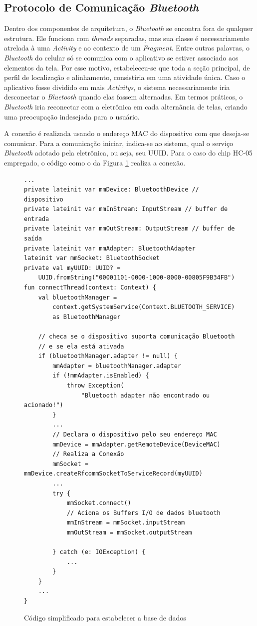 \subsection{Protocolo de Comunicação \textit{Bluetooth}}
\label{sec:btandroid}
Dentro dos componentes de arquitetura, o \textit{Bluetooth} se encontra fora de qualquer estrutura. Ele funciona com \textit{threads} separadas, mas sua classe é necessariamente atrelada à uma \textit{Activity} e ao contexto de um \textit{Fragment}. Entre outras palavras, o \textit{Bluetooth} do celular só se comunica com o aplicativo se estiver associado aos elementos da tela. Por esse motivo, estabeleceu-se que toda a seção principal, de perfil de localização e alinhamento, consistiria em uma atividade única. Caso o aplicativo fosse dividido em mais \textit{Activitys}, o sistema necessariamente iria desconectar o \textit{Bluetooth} quando elas fossem alternadas. Em termos práticos, o \textit{Bluetooth} iria reconectar com a eletrônica em cada alternância de telas, criando uma preocupação indesejada para o usuário. 

A conexão é realizada usando o endereço MAC do dispositivo com que deseja-se comunicar. Para a comunicação iniciar, indica-se ao sistema, qual o serviço \textit{Bluetooth} adotado pela eletrônica, ou seja, seu UUID. Para o caso do chip HC-05 empregado, o código como o da Figura \ref{code:bluetoothconnection} realiza a conexão.

\begin{figure}[!htb]
	\centering
	\caption{Código simplificado para estabelecer a base de dados}
	\vspace{-15pt}
	\begin{verbatim}
...
private lateinit var mmDevice: BluetoothDevice // dispositivo
private lateinit var mmInStream: InputStream // buffer de entrada
private lateinit var mmOutStream: OutputStream // buffer de saída
private lateinit var mmAdapter: BluetoothAdapter 
lateinit var mmSocket: BluetoothSocket
private val myUUID: UUID? =
	UUID.fromString("00001101-0000-1000-8000-00805F9B34FB")
fun connectThread(context: Context) {
	val bluetoothManager =
		context.getSystemService(Context.BLUETOOTH_SERVICE)
		as BluetoothManager
	
	// checa se o dispositivo suporta comunicação Bluetooth
	// e se ela está ativada
	if (bluetoothManager.adapter != null) {
		mmAdapter = bluetoothManager.adapter
		if (!mmAdapter.isEnabled) {
			throw Exception(
				"Bluetooth adapter não encontrado ou acionado!")
		}
		...
		// Declara o dispositivo pelo seu endereço MAC
		mmDevice = mmAdapter.getRemoteDevice(DeviceMAC)
		// Realiza a Conexão
		mmSocket = mmDevice.createRfcommSocketToServiceRecord(myUUID)
		...
		try {
			mmSocket.connect()
			// Aciona os Buffers I/O de dados bluetooth
			mmInStream = mmSocket.inputStream
			mmOutStream = mmSocket.outputStream
			
		} catch (e: IOException) {
			...
		}
	}
	...
}		
	\end{verbatim}
	\label{code:bluetoothconnection}
	\vspace{-30pt}
\end{figure}

